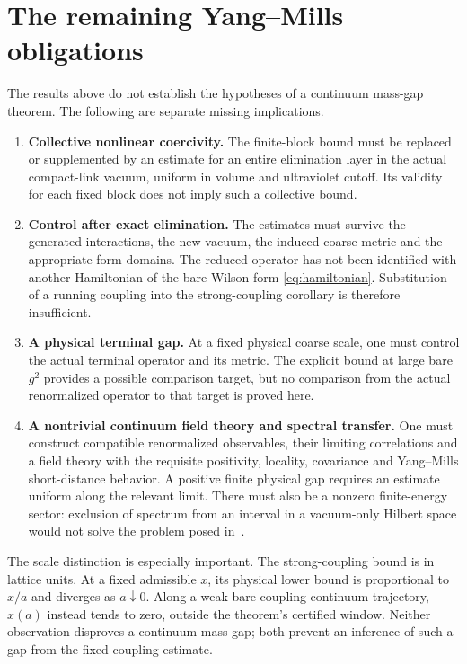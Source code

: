 \section{The remaining Yang--Mills obligations}\label{sec:open}

The results above do not establish the hypotheses of a continuum
mass-gap theorem. The following are separate missing implications.

\begin{enumerate}
\item \textbf{Collective nonlinear coercivity.}
The finite-block bound must be replaced or supplemented by an estimate
for an entire elimination layer in the actual compact-link vacuum,
uniform in volume and ultraviolet cutoff. Its validity for each fixed
block does not imply such a collective bound.

\item \textbf{Control after exact elimination.}
The estimates must survive the generated interactions, the new vacuum,
the induced coarse metric and the appropriate form domains.
The reduced operator has not been identified with another Hamiltonian
of the bare Wilson form \eqref{eq:hamiltonian}. Substitution of a running
coupling into the strong-coupling corollary is therefore insufficient.

\item \textbf{A physical terminal gap.}
At a fixed physical coarse scale, one must control the actual terminal
operator and its metric. The explicit bound at large bare $g^2$ provides
a possible comparison target, but no comparison from the actual
renormalized operator to that target is proved here.

\item \textbf{A nontrivial continuum field theory and spectral transfer.}
One must construct compatible renormalized observables, their limiting
correlations and a field theory with the requisite positivity, locality,
covariance and Yang--Mills short-distance behavior. A positive finite
physical gap requires an estimate uniform along the relevant limit.
There must also be a nonzero finite-energy sector: exclusion of spectrum
from an interval in a vacuum-only Hilbert space would not solve the
problem posed in~\cite{JW}.
\end{enumerate}

The scale distinction is especially important. The strong-coupling
bound is in lattice units. At a fixed admissible $x$, its physical lower
bound is proportional to $x/a$ and diverges as $a\downarrow0$.
Along a weak bare-coupling continuum trajectory, $x(a)$ instead tends
to zero, outside the theorem's certified window. Neither observation
disproves a continuum mass gap; both prevent an inference of such a
gap from the fixed-coupling estimate.

